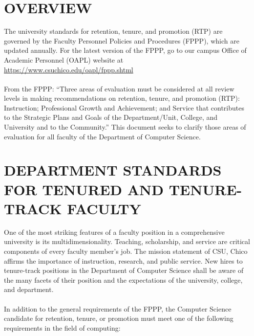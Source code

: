 \documentclass{article}
\begin{document}
\fancyhead{}\fancyfoot{}

{
}

\setlength{\parindent}{0pt}

\section{OVERVIEW}

The university standards for retention, tenure, and promotion (RTP) are governed by the Faculty Personnel Policies and Procedures (FPPP), which are updated annually. For the latest version of the FPPP, go to our campus Office of Academic Personnel (OAPL) website at \href{https://www.csuchico.edu/oapl/fppp.shtml}{https://www.csuchico.edu/oapl/fppp.shtml}
\\\\
From the FPPP: “Three areas of evaluation must be considered at all review levels in making recommendations on retention, tenure, and promotion (RTP): Instruction; Professional Growth and Achievement; and Service that contributes to the Strategic Plans and Goals of the Department/Unit, College, and University and to the Community.” This document seeks to clarify those areas of evaluation for all faculty of the Department of Computer Science.

 \thispagestyle{firststyle}

\section{DEPARTMENT STANDARDS FOR TENURED AND TENURE-TRACK FACULTY }

One of the most striking features of a faculty position in a comprehensive university is its multidimensionality. Teaching, scholarship, and service are critical components of every faculty member’s job. The mission statement of CSU, Chico affirms the importance of instruction, research, and public service. New hires to tenure-track positions in the Department of Computer Science shall be aware of the many facets of their position and the expectations of the university, college, and department.
\\\\
In addition to the general requirements of the FPPP, the Computer Science candidate for retention, tenure, or promotion must meet one of the following requirements in the field of computing:
\end{document}
